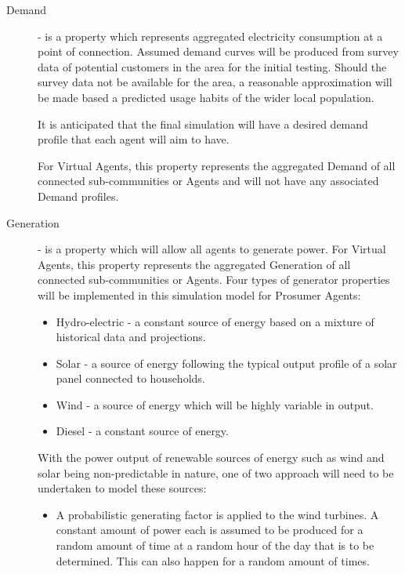 \begin{description}
\item[Demand] - is a property which represents aggregated electricity consumption at a point of connection. Assumed demand curves will be produced from survey data of potential customers in the area for the initial testing. Should the survey data not be available for the area, a reasonable approximation will be made based a predicted usage habits of the wider local population.

It is anticipated that the final simulation will have a desired demand profile that each agent will aim to have. 

For Virtual Agents, this property represents the aggregated Demand of all connected sub-communities or Agents and will not have any associated Demand profiles.

\item[Generation] - is a property which will allow all agents to generate power. For Virtual Agents, this property represents the aggregated Generation of all connected sub-communities or Agents. Four types of generator properties will be implemented in this simulation model for Prosumer Agents: 

\begin{itemize}
  \item Hydro-electric - a constant source of energy based on a mixture of historical data and projections.
  \item Solar - a source of energy following the typical output profile of a solar panel connected to households.
  \item Wind - a source of energy which will be highly variable in output.
  \item Diesel - a constant source of energy.
\end{itemize}

With the power output of renewable sources of energy such as wind and solar being non-predictable in nature, one of two approach will need to be undertaken to model these sources:
\begin{itemize}
  
  \item A probabilistic generating factor is applied to the wind turbines. A constant amount of power each is assumed to be produced for a random amount of time at a random hour of the day that is to be determined. This can also happen for a random amount of times.
  

\end{itemize}
\end{description}
